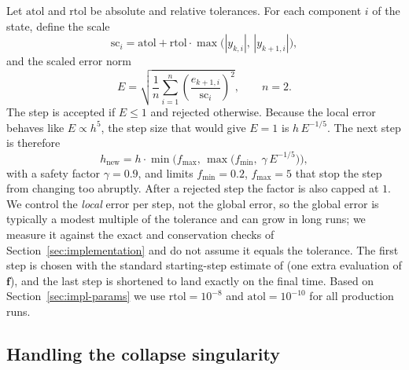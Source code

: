 Let $\mathrm{atol}$ and $\mathrm{rtol}$ be absolute and relative tolerances. For each component $i$ of the state, define the scale
\begin{equation}
\mathrm{sc}_i=\mathrm{atol}+\mathrm{rtol}\cdot\max\!\big(|y_{k,i}|,\,|y_{k+1,i}|\big),
\end{equation}
and the scaled error norm
\begin{equation}
E=\sqrt{\frac1n\sum_{i=1}^{n}\left(\frac{e_{k+1,i}}{\mathrm{sc}_i}\right)^{2}},\qquad n=2 .
\end{equation}
The step is accepted if $E\le1$ and rejected otherwise. Because the local error behaves like $E\propto h^{5}$, the step size that would give $E=1$ is $h\,E^{-1/5}$. The next step is therefore
\begin{equation}
h_{\mathrm{new}}=h\cdot\min\!\Big(f_{\max},\,\max\!\big(f_{\min},\;\gamma\,E^{-1/5}\big)\Big),
\end{equation}
with a safety factor $\gamma=0.9$, and limits $f_{\min}=0.2$, $f_{\max}=5$ that stop the step from changing too abruptly. After a rejected step the factor is also capped at $1$. We control the \emph{local} error per step, not the global error, so the global error is typically a modest multiple of the tolerance and can grow in long runs; we measure it against the exact and conservation checks of Section~\ref{sec:implementation} and do not assume it equals the tolerance. The first step is chosen with the standard starting-step estimate of \cite{hairer1993} (one extra evaluation of $\mathbf{f}$), and the last step is shortened to land exactly on the final time. Based on Section~\ref{sec:impl-params} we use $\mathrm{rtol}=10^{-8}$ and $\mathrm{atol}=10^{-10}$ for all production runs.

\subsection{Handling the collapse singularity}
\label{sec:method-singular}

